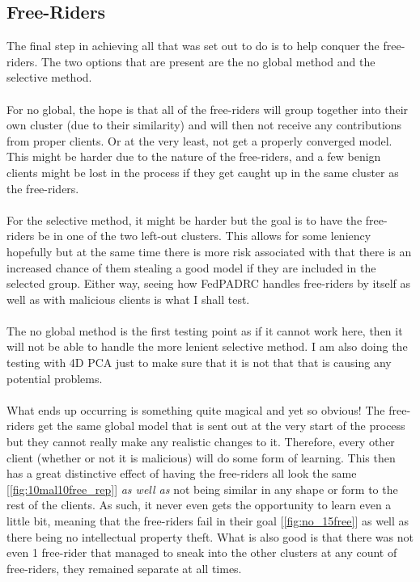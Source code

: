 \subsection{Free-Riders}
The final step in achieving all that was set out to do is to help conquer the free-riders.
The two options that are present are the no global method and the selective method.
\\ \\
For no global, the hope is that all of the free-riders will group together into their own cluster (due to their similarity) and will then not receive any contributions from proper clients.
Or at the very least, not get a properly converged model.
This might be harder due to the nature of the free-riders, and a few benign clients might be lost in the process if they get caught up in the same cluster as the free-riders.
\\ \\
For the selective method, it might be harder but the goal is to have the free-riders be in one of the two left-out clusters.
This allows for some leniency hopefully but at the same time there is more risk associated with that there is an increased chance of them stealing a good model if they are included in the selected group.
Either way, seeing how FedPADRC handles free-riders by itself as well as with malicious clients is what I shall test.
\\ \\
The no global method is the first testing point as if it cannot work here, then it will not be able to handle the more lenient selective method.
I am also doing the testing with 4D PCA just to make sure that it is not that that is causing any potential problems.
\\ \\
What ends up occurring is something quite magical and yet so obvious!
The free-riders get the same global model that is sent out at the very start of the process but they cannot really make any realistic changes to it.
Therefore, every other client (whether or not it is malicious) will do some form of learning.
This then has a great distinctive effect of having the free-riders all look the same [\ref{fig:10mal10free_rep}] \textit{as well as} not being similar in any shape or form to the rest of the clients.
As such, it never even gets the opportunity to learn even a little bit, meaning that the free-riders fail in their goal [\ref{fig:no_15free}] as well as there being no intellectual property theft.
What is also good is that there was not even 1 free-rider that managed to sneak into the other clusters at any count of free-riders, they remained separate at all times.
